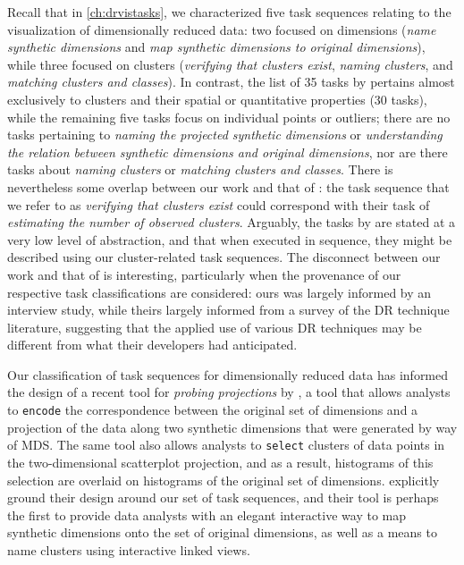 Recall that in \autoref{ch:drvistasks}, we characterized five task sequences relating to the visualization of dimensionally reduced data: two focused on dimensions ({\it name synthetic dimensions} and {\it map synthetic dimensions to original dimensions}), while three focused on clusters ({\it verifying that clusters exist}, {\it naming clusters}, and {\it matching clusters and classes}). 
In contrast, the list of 35 tasks by \citet{Etemadpour2015} pertains almost exclusively to clusters and their spatial or quantitative properties (30 tasks), while the remaining five tasks focus on individual points or outliers; there are no tasks pertaining to {\it naming the projected synthetic dimensions} or {\it understanding the relation between synthetic dimensions and original dimensions}, nor are there tasks about {\it naming clusters} or {\it matching clusters and classes}.
There is nevertheless some overlap between our work and that of \citet{Etemadpour2015}: the task sequence that we refer to as {\it verifying that clusters exist} could correspond with their task of {\it estimating the number of observed clusters}.
Arguably, the tasks by \citet{Etemadpour2015} are stated at a very low level of abstraction, and that when executed in sequence, they might be described using our cluster-related task sequences.
The disconnect between our work and that of \citet{Etemadpour2015} is interesting, particularly when the provenance of our respective task classifications are considered: ours was largely informed by an interview study, while theirs largely informed from a survey of the \ac{DR} technique literature, suggesting that the applied use of various \ac{DR} techniques may be different from what their developers had anticipated.

Our classification of task sequences for dimensionally reduced data has informed the design of a recent tool for {\it probing projections} by \citet{Stahnke2015}, a tool that allows analysts to {\tt encode} the correspondence between the original set of dimensions and a projection of the data along two synthetic dimensions that were generated by way of \ac{MDS}. 
The same tool also allows analysts to {\tt select} clusters of data points in the two-dimensional scatterplot projection, and as a result, histograms of this selection are overlaid on histograms of the original set of dimensions.
\citet{Stahnke2015} explicitly ground their design around our set of task sequences, and their tool is perhaps the first to provide data analysts with an elegant interactive way to map synthetic dimensions onto the set of original dimensions, as well as a means to name clusters using interactive linked views. 

